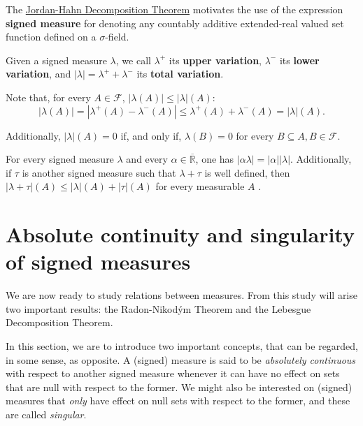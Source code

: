 The \href{theorem:Jordan-Hahn Decomposition}{Jordan-Hahn Decomposition Theorem}
motivates the use of the expression \textbf{signed measure} for denoting any
countably additive extended-real valued set function defined on a
\(\sigma\)-field.

Given a signed measure \(\lambda\), we call \(\lambda^+\) its \textbf{upper
variation}, \(\lambda^-\) its \textbf{lower variation}, and
\(\left|\lambda\right|=\lambda^++\lambda^-\) its \textbf{total variation}.

\begin{remk}\label{remark:characterisation of nullity of TV} Note that, for
every \(A\in\mathcal{F}\), \(\left|\lambda(A)\right|\leq \left|\lambda\right|(A)\):
	\[ \left|\lambda(A)\right|=\left|\lambda^+(A)-\lambda^-(A)\right|\leq\lambda^+(A)+\lambda^-(A)=\left|\lambda\right|(A) .\]
	
	Additionally, \(\left|\lambda\right|(A)=0\) if, and only if,
\(\lambda(B)=0\) for every \(B\subseteq A, B\in\mathcal{F}\).
\end{remk}

\begin{remk}\label{remark:triangular inequality for signed measures}
  For every signed measure \(\lambda\) and every \(\alpha\in \overline{\mathbb{R}}\), one has \(|\alpha\lambda|=|\alpha||\lambda|\). Additionally, if \(\tau\) is another signed measure such that \(\lambda+\tau\) is well defined, then \(|\lambda+\tau|(A)\leq|\lambda|(A)+|\tau|(A)\) for every measurable \(A\) .
\end{remk}
\section{Absolute continuity and singularity of signed measures}
We are now ready to study relations between measures. From this study will arise two
important results: the Radon-Nikodým Theorem and the Lebesgue Decomposition
Theorem.

In this section, we are to introduce two important concepts, that can be regarded, in some sense, as opposite. A (signed) measure is said to be
\emph{absolutely continuous} with respect to another signed measure whenever it can have no effect on
sets that are null with respect to the former. We might also be interested on (signed) measures
that \emph{only} have effect on null sets with respect to the former, and these are called \emph{singular}.



